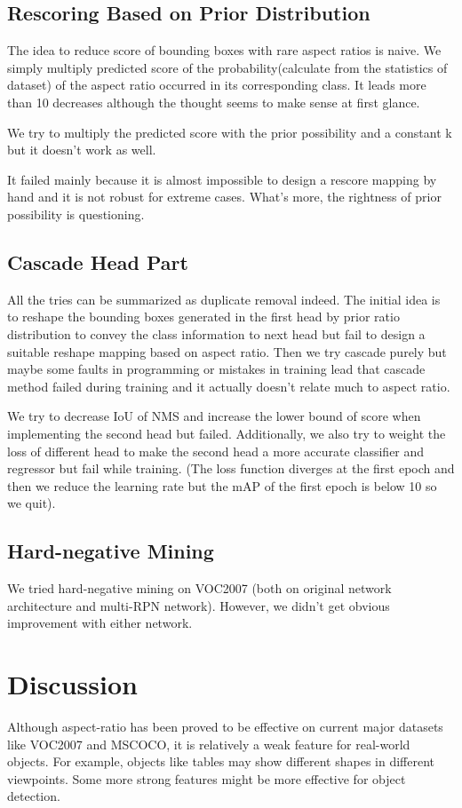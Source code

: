 \documentclass[10pt,twocolumn,letterpaper]{article}
\begin{document}
\subsection{Rescoring Based on Prior Distribution}
The idea to reduce score of bounding boxes with rare aspect ratios is naive. We simply multiply predicted score of the probability(calculate from the statistics of dataset) of the aspect ratio occurred in its corresponding class. It leads more than 10 decreases although the thought seems to make sense at first glance.
\par
We try to multiply the predicted score with the prior possibility and a constant k but it doesn't work as well.
\par
It failed mainly because it is almost impossible to design a rescore mapping by hand and it is not robust for extreme cases. What's more, the rightness of prior possibility is questioning.

\subsection{Cascade Head Part}
\par
All the tries can be summarized as duplicate removal indeed. The initial idea is to reshape the bounding boxes generated in the first head by prior ratio distribution to convey the class information to next head but fail to design a suitable reshape mapping based on aspect ratio. Then we try cascade purely but maybe some faults in programming or mistakes in training lead that cascade method failed during training and it actually doesn't relate much to aspect ratio.
\par
We try to decrease IoU of NMS and increase the lower bound of score when implementing the second head but failed. Additionally, we also try to weight the loss of different head to make the second head a more accurate classifier and regressor but fail while training. (The loss function diverges at the first epoch and then we reduce the learning rate but the mAP of the first epoch is below 10 so we quit).

\subsection{Hard-negative Mining}
We tried hard-negative mining on VOC2007 (both on original network architecture and multi-RPN network). However, we didn't get obvious improvement with either network. 


\section{Discussion}
\par
Although aspect-ratio has been proved to be effective on current major datasets like VOC2007\cite{voc07} and MSCOCO\cite{coco}, it is relatively a weak feature for real-world objects. For example, objects like tables may show different shapes in different viewpoints. Some more strong features might be more effective for object detection.  
\end{document}
